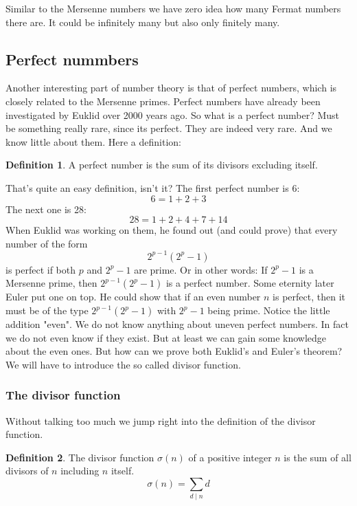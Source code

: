\documentclass{article}
\theoremstyle{definition}
\newtheorem{definition}{Definition}[section]
\begin{document}
Similar to the Mersenne numbers we have zero idea how many Fermat numbers there are. It could be infinitely many but also only finitely many.

\subsection{Perfect nummbers}
Another interesting part of number theory is that of perfect numbers, which is closely related to the Mersenne primes. Perfect numbers have already been investigated by Euklid over 2000 years ago. So what is a perfect number? Must be something really rare, since its perfect.
They are indeed very rare. And we know little about them. Here a definition:
\begin{definition}
    A perfect number is the sum of its divisors excluding itself.
\end{definition}
That's quite an easy definition, isn't it? The first perfect number is 6:
\begin{equation}
    6 = 1 + 2 + 3
\end{equation}
The next one is 28:
\begin{equation}
    28 = 1 + 2 + 4 + 7 + 14
\end{equation}
When Euklid was working on them, he found out (and could prove) that every number of the form 
\begin{equation}
    2^{p-1}(2^p-1)
\end{equation}
is perfect if both $p$ and $2^p-1$ are prime. Or in other words: If $2^p-1$ is a Mersenne prime, then $2^{p-1}(2^p-1)$ is a perfect number. Some eternity later Euler put one on top. He could show that if an even number $n$ is perfect, then it must be of the type $2^{p-1}(2^p-1)$ with $2^p-1$ being prime.
Notice the little addition "even". We do not know anything about uneven perfect numbers. In fact we do not even know if they exist. But at least we can gain some knowledge about the even ones. But how can we prove both Euklid's and Euler's theorem? We will have to introduce the so called divisor function.

\subsubsection{The divisor function}
Without talking too much we jump right into the definition of the divisor function.
\begin{definition}
    The divisor function $\sigma (n)$ of a positive integer $n$ is the sum of all divisors of $n$ including $n$ itself.
    \begin{equation}
        \sigma (n) = \sum_{d \mid n} d
    \end{equation}
\end{definition}
\end{document}
